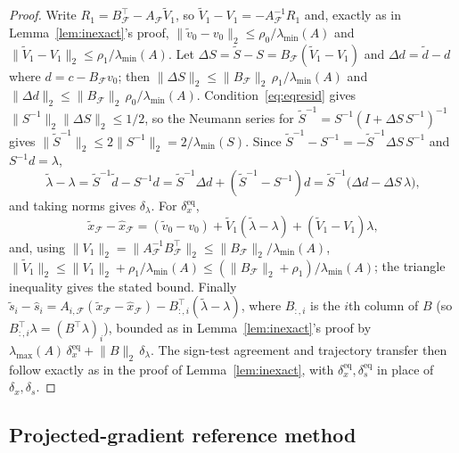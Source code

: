\begin{proof}
Write $R_1 = B_{\mathcal{F}}^\top - A_{\mathcal{F}}\tilde V_1$, so $\tilde V_1 - V_1 =
-A_{\mathcal{F}}^{-1}R_1$ and, exactly as in Lemma~\ref{lem:inexact}'s proof,
$\lVert \tilde v_0 - v_0 \rVert_2 \le \rho_0/\lambda_{\min}(A)$ and
$\lVert \tilde V_1 - V_1 \rVert_2 \le \rho_1/\lambda_{\min}(A)$. Let
$\Delta S = \tilde S - S = B_{\mathcal{F}}(\tilde V_1 - V_1)$ and $\Delta d = \tilde d - d$
where $d = c - B_{\mathcal{F}}v_0$; then
$\lVert \Delta S \rVert_2 \le \lVert B_{\mathcal{F}} \rVert_2\,\rho_1/\lambda_{\min}(A)$ and
$\lVert \Delta d \rVert_2 \le \lVert B_{\mathcal{F}} \rVert_2\,\rho_0/\lambda_{\min}(A)$.
Condition~\eqref{eq:eqresid} gives $\lVert S^{-1}\rVert_2 \lVert\Delta S\rVert_2 \le 1/2$, so
the Neumann series for $\tilde S^{-1} = S^{-1}(I + \Delta S\,S^{-1})^{-1}$ gives
$\lVert \tilde S^{-1} \rVert_2 \le 2\lVert S^{-1} \rVert_2 = 2/\lambda_{\min}(S)$. Since
$\tilde S^{-1} - S^{-1} = -\tilde S^{-1}\Delta S\,S^{-1}$ and $S^{-1}d = \lambda$,
\[
  \tilde\lambda - \lambda = \tilde S^{-1}\tilde d - S^{-1}d
  = \tilde S^{-1}\Delta d + (\tilde S^{-1}-S^{-1})d
  = \tilde S^{-1}\big(\Delta d - \Delta S\,\lambda\big),
\]
and taking norms gives $\delta_\lambda$. For $\delta_x^{\mathrm{eq}}$,
\[
  \tilde x_{\mathcal{F}} - \hat x_{\mathcal{F}} = (\tilde v_0 - v_0) +
  \tilde V_1(\tilde\lambda - \lambda) + (\tilde V_1 - V_1)\lambda,
\]
and, using $\lVert V_1 \rVert_2 = \lVert A_{\mathcal{F}}^{-1}B_{\mathcal{F}}^\top \rVert_2 \le
\lVert B_{\mathcal{F}} \rVert_2/\lambda_{\min}(A)$,
$\lVert \tilde V_1 \rVert_2 \le \lVert V_1 \rVert_2 + \rho_1/\lambda_{\min}(A) \le
(\lVert B_{\mathcal{F}} \rVert_2 + \rho_1)/\lambda_{\min}(A)$; the triangle inequality gives
the stated bound. Finally $\tilde s_i - \hat s_i = A_{i,\mathcal{F}}(\tilde x_{\mathcal{F}} -
\hat x_{\mathcal{F}}) - B_{:,i}^\top(\tilde\lambda - \lambda)$, where $B_{:,i}$ is the $i$th
column of $B$ (so $B_{:,i}^\top\lambda = (B^\top\lambda)_i$), bounded as in
Lemma~\ref{lem:inexact}'s proof by $\lambda_{\max}(A)\,\delta_x^{\mathrm{eq}} + \lVert B
\rVert_2\,\delta_\lambda$. The sign-test agreement and trajectory transfer then follow exactly
as in the proof of Lemma~\ref{lem:inexact}, with $\delta_x^{\mathrm{eq}},
\delta_s^{\mathrm{eq}}$ in place of $\delta_x, \delta_s$.
\end{proof}

\subsection{Projected-gradient reference method}\label{ssec:proj}

